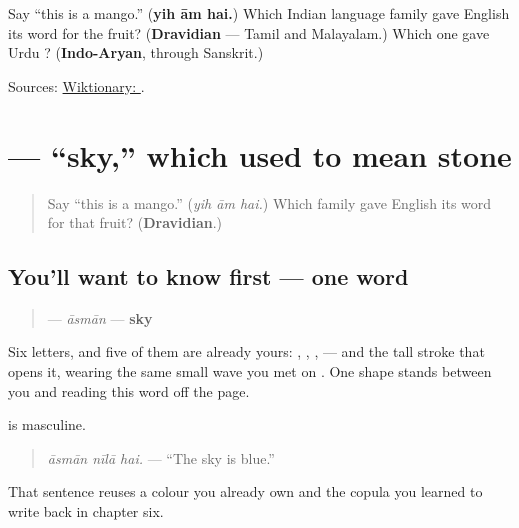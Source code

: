 \begin{tcolorbox}[breakable,colback=teal!4,colframe=teal!35!black,title={Before you move on}]
Say \textquotedblleft{}this is a mango.\textquotedblright{} (\textbf{yih ām hai.}) Which Indian language family gave English its word for the fruit? (\textbf{Dravidian} — Tamil and Malayalam.) Which one gave Urdu \textbf{}? (\textbf{Indo-Aryan}, through Sanskrit.)

Sources: \href{https://en.wiktionary.org/wiki/\%D8\%A2\%D9\%85}{Wiktionary: }.
\end{tcolorbox}
\section[\texorpdfstring{\ur{آسمان} (āsmān)}{آسمان (āsmān)}]{ — \textquotedblleft{}sky,\textquotedblright{} which used to mean stone}

\label{lesson:UR-C18-aasmaan}



\begin{quote}
Say \textquotedblleft{}this is a mango.\textquotedblright{} (\emph{yih ām hai.}) Which family gave English its word for that fruit? (\textbf{Dravidian}.)
\end{quote}

\subsection*{You'll want to know first — one word}
\begin{quote}
\textbf{} — \emph{āsmān} — \textbf{sky}
\end{quote}

Six letters, and five of them are already yours: \textbf{}, \textbf{}, \textbf{}, \textbf{} — and the tall stroke that opens it, wearing the same small wave you met on \textbf{}. One shape stands between you and reading this word off the page.

\textbf{} is masculine.

\begin{quote}
\emph{āsmān nīlā hai.} — \textquotedblleft{}The sky is blue.\textquotedblright{}
\end{quote}

That sentence reuses a colour you already own and the copula you learned to write back in chapter six.

